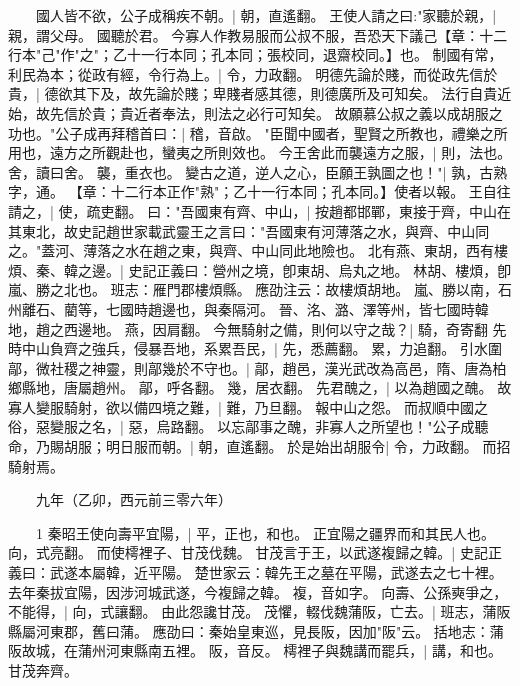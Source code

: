 　　國人皆不欲，公子成稱疾不朝。|{
	朝，直遙翻。
}
王使人請之曰:"家聽於親，|{
	親，謂父母。
}
國聽於君。
	今寡人作教易服而公叔不服，吾恐天下議己【章：十二行本"己"作"之"；乙十一行本同；孔本同；張校同，退齋校同。】也。
	制國有常，利民為本；從政有經，令行為上。|{
	令，力政翻。
}
明德先論於賤，而從政先信於貴，|{
	德欲其下及，故先論於賤；卑賤者感其德，則德廣所及可知矣。
	法行自貴近始，故先信於貴；貴近者奉法，則法之必行可知矣。
}
故願慕公叔之義以成胡服之功也。"公子成再拜稽首曰：|{
	稽，音啟。
}
"臣聞中國者，聖賢之所教也，禮樂之所用也，遠方之所觀赴也，蠻夷之所則效也。
	今王舍此而襲遠方之服，|{
	則，法也。
	舍，讀曰舍。
	襲，重衣也。
}
變古之道，逆人之心，臣願王孰圖之也！"|{
	孰，古熟字，通。
}
【章：十二行本正作"熟"；乙十一行本同；孔本同。】使者以報。
	王自往請之，|{
	使，疏吏翻。
}
曰："吾國東有齊、中山，|{
	按趙都邯鄲，東接于齊，中山在其東北，故史記趙世家載武靈王之言曰："吾國東有河薄落之水，與齊、中山同之。"蓋河、薄落之水在趙之東，與齊、中山同此地險也。
}
北有燕、東胡，西有樓煩、秦、韓之邊。|{
	史記正義曰：營州之境，卽東胡、烏丸之地。
	林胡、樓煩，卽嵐、勝之北也。
	班志：雁門郡樓煩縣。
	應劭注云：故樓煩胡地。
	嵐、勝以南，石州離石、藺等，七國時趙邊也，與秦隔河。
	晉、洺、潞、澤等州，皆七國時韓地，趙之西邊地。
	燕，因肩翻。
}
今無騎射之備，則何以守之哉？|{
	騎，奇寄翻
	}
先時中山負齊之強兵，侵暴吾地，系累吾民，|{
	先，悉薦翻。
	累，力追翻。
}
引水圍鄗，微社稷之神靈，則鄗幾於不守也。|{
	鄗，趙邑，漢光武改為高邑，隋、唐為柏鄉縣地，唐屬趙州。
	鄗，呼各翻。
	幾，居衣翻。
}
先君醜之，|{
	以為趙國之醜。
}
故寡人變服騎射，欲以備四境之難，|{
	難，乃旦翻。
}
報中山之怨。
	而叔順中國之俗，惡變服之名，|{
	惡，烏路翻。
}
以忘鄗事之醜，非寡人之所望也！"公子成聽命，乃賜胡服；明日服而朝。|{
	朝，直遙翻。
}
於是始出胡服令|{
	令，力政翻。
}
而招騎射焉。


　　九年（乙卯，西元前三零六年）

　　1 秦昭王使向壽平宜陽，|{
	平，正也，和也。
	正宜陽之疆界而和其民人也。
	向，式亮翻。
}
而使樗裡子、甘茂伐魏。
	甘茂言于王，以武遂複歸之韓。|{
	史記正義曰：武遂本屬韓，近平陽。
	楚世家云：韓先王之墓在平陽，武遂去之七十裡。
	去年秦拔宜陽，因涉河城武遂，今複歸之韓。
	複，音如字。
}
向壽、公孫奭爭之，不能得，|{
	向，式讓翻。
}
由此怨讒甘茂。
	茂懼，輟伐魏蒲阪，亡去。|{
	班志，蒲阪縣屬河東郡，舊曰蒲。
	應劭曰：秦始皇東巡，見長阪，因加"阪"云。
	括地志：蒲阪故城，在蒲州河東縣南五裡。
	阪，音反。
}
樗裡子與魏講而罷兵，|{
	講，和也。
}
甘茂奔齊。


